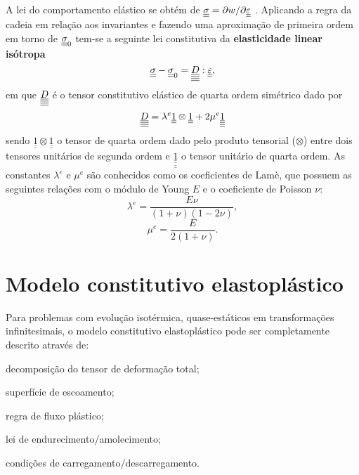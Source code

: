 A lei do comportamento elástico se obtém de $\underline{\underline \sigma} = \partial w / \partial \underline{\underline \varepsilon}$ . Aplicando a regra da cadeia em relação aos invariantes e fazendo uma aproximação de primeira ordem em torno de $\underline{\underline \sigma}_0$ tem-se a seguinte lei constitutiva da \textbf{elasticidade linear isótropa} \cite[p. 340]{Salencon2001}
\begin{equation}
	\label{eq:lei_elasticidade}
	\underline{\underline \sigma} - \underline{\underline \sigma}_0 = \underline{\underline{\underline{\underline D}}}:\underline{\underline \varepsilon},
\end{equation}
em que $\underline{\underline{\underline{\underline D}}}$ é o tensor constitutivo elástico de quarta ordem simétrico dado por
\begin{equation}
	\label{eq:tensor_constitutivo_elastico}
 	\underline{\underline{\underline{\underline D}}} = \lambda^e \underline{\underline 1} \otimes \underline{\underline 1} + 2 \mu^e \underline{\underline{\underline{\underline 1}}}
\end{equation}
sendo $\underline{\underline 1} \otimes \underline{\underline 1}$ o tensor de quarta ordem dado pelo produto tensorial ($\otimes$) entre dois tensores unitários de segunda ordem e $\underline{\underline{\underline{\underline 1}}}$ o tensor unitário de quarta ordem. As constantes $\lambda^e$ e $\mu^e$ são conhecidos como os coeficientes de Lamè, que possuem as seguintes relações com o módulo de Young $E$ e o coeficiente de Poisson $\nu$:
\begin{equation}
	\label{eq:lambdae}
	\lambda^e = \frac{E \nu}{(1+\nu)(1-2\nu)},
\end{equation}
\begin{equation}
	\label{eq:mue}
	\mu^e = \frac{E}{2(1+\nu)}.
\end{equation}

\section{Modelo constitutivo elastoplástico}

Para problemas com evolução isotérmica, quase-estáticos em transformações infinitesimais, o modelo constitutivo elastoplástico pode ser completamente descrito através de:
\begin{alineas}
	\item decomposição do tensor de deformação total;
	\item superfície de escoamento;
	\item regra de fluxo plástico;
	\item lei de endurecimento/amolecimento;
	\item condições de carregamento/descarregamento.
\end{alineas}

